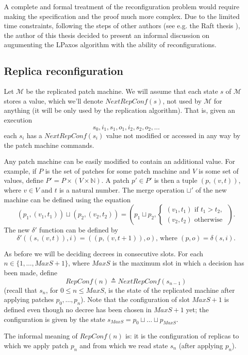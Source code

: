 \documentclass[12pt,a4paper,en]{pracamgr}
\newcommand{\mc}[1]{\mathcal{#1}}
\newcommand{\mbb}[1]{\mathbb{#1}}
\begin{document}
A complete and formal treatment of the reconfiguration problem would require making the specification and the proof much more complex. Due to the limited time constraints, following the steps of other authors (see e.g. the Raft thesis \cite{bridging}), the author of this thesis decided to present an informal discussion on augumenting the LPaxos algorithm with the ability of reconfigurations.

\subsection{Replica reconfiguration}\label{rep-reconf}

Let $\mc M$ be the replicated patch machine. We will assume that each state $s$ of $\mc M$ stores a value, which we'll denote $NextRepConf(s)$, not used by $\mc M$ for anything (it will be only used by the replication algorithm). That is, given an execution
$$ s_0, i_1, s_1, o_1, i_2, s_2, o_2, \dots $$
each $s_i$ has a $NextRepConf(s_i)$ value not modified or accessed in any way by the patch machine commands.

Any patch machine can be easily modified to contain an additional value. For example, if $P$ is the set of patches for some patch machine and $V$ is some set of values, define $P' = P \times (V \times \mbb N)$. A patch $p' \in P'$ is then a tuple $(p, (v, t))$, where $v \in V$ and $t$ is a natural number. The merge operation $\sqcup'$ of the new machine can be defined using the equation
$$ (p_1, (v_1, t_1)) \sqcup (p_2, (v_2, t_2)) = (p_1 \sqcup p_2, \begin{cases} (v_1, t_1)\text{ if } t_1 > t_2,\\ (v_2, t_2)\text{ otherwise } \end{cases}). $$
The new $\delta'$ function can be defined by
$$ \delta'((s, (v, t)), i) = ((p, (v, t + 1)), o)\text{, where } (p, o) = \delta(s, i). $$

As before we will be deciding decrees in consecutive slots. For each $n \in \{1, \dots, MaxS+1\}$, where $MaxS$ is the maximum slot in which a decision has been made, define
$$ RepConf(n) \triangleq NextRepConf(s_{n-1}) $$
(recall that $s_n$, for $0 \le n \le MaxS$, is the state of the replicated machine after applying patches $p_0, \dots, p_n$).
Note that the configuration of slot $MaxS + 1$ is defined even though no decree has been chosen in $MaxS + 1$ yet; the configuration is given by the state $s_{MaxS} = p_0 \sqcup \dots \sqcup p_{MaxS}$.

The informal meaning of $RepConf(n)$ is: it is the configuration of replicas to which we apply patch $p_n$ and from which we read state $s_n$ (after applying $p_n$).
\end{document}
